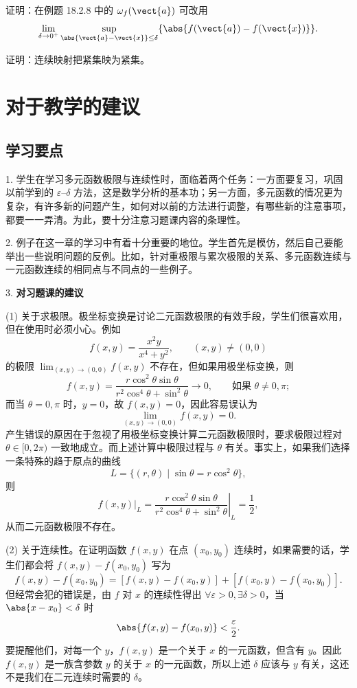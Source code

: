 \begin{xexercise}[9]
证明：在例题 18.2.8 中的 $\omega_f(\vect{a})$ 可改用
  \[
    \lim_{\delta\to0^+}\sup_{\abs{\vect{a}-\vect{x}}\le\delta}
    \{\abs{f(\vect{a})-f(\vect{x})}\}.
  \]
\end{xexercise}

\begin{xexercise}[10]
证明：连续映射把紧集映为紧集。
\end{xexercise}

\section{对于教学的建议}

\subsection{学习要点}

1. 学生在学习多元函数极限与连续性时，面临着两个任务：一方面要复习，巩固以前学到的 $\varepsilon$--$\delta$ 方法，这是数学分析的基本功；另一方面，多元函数的情况更为复杂，有许多新的问题产生，如何对以前的方法进行调整，有哪些新的注意事项，都要一一弄清。为此，要十分注意习题课内容的条理性。

2. 例子在这一章的学习中有着十分重要的地位。学生首先是模仿，然后自己要能举出一些说明问题的反例。比如，针对重极限与累次极限的关系、多元函数连续与一元函数连续的相同点与不同点的一些例子。

3. \textbf{对习题课的建议}

(1) 关于求极限。极坐标变换是讨论二元函数极限的有效手段，学生们很喜欢用，但在使用时必须小心。例如
\[
  f(x,y)=\frac{x^2y}{x^4+y^2},\qquad (x,y)\ne(0,0)
\]
的极限 $\displaystyle\lim_{(x,y)\to(0,0)}f(x,y)$ 不存在，但如果用极坐标变换，则
\[
  f(x,y)=\frac{r\cos^2\theta\sin\theta}{r^2\cos^4\theta+\sin^2\theta}\to0,
  \qquad \text{如果 }\theta\ne0,\pi;
\]
而当 $\theta=0,\pi$ 时，$y=0$，故 $f(x,y)=0$，因此容易误认为
\[
  \lim_{(x,y)\to(0,0)}f(x,y)=0.
\]
产生错误的原因在于忽视了用极坐标变换计算二元函数极限时，要求极限过程对 $\theta\in[0,2\pi)$ 一致地成立。而上述计算中极限过程与 $\theta$ 有关。事实上，如果我们选择一条特殊的趋于原点的曲线
\[
  L=\{(r,\theta)\mid\sin\theta=r\cos^2\theta\},
\]
则
\[
  f(x,y)\big|_L
  =\left.\frac{r\cos^2\theta\sin\theta}{r^2\cos^4\theta+\sin^2\theta}\right|_L
  =\frac12,
\]
从而二元函数极限不存在。

(2) 关于连续性。在证明函数 $f(x,y)$ 在点 $(x_0,y_0)$ 连续时，如果需要的话，学生们都会将 $f(x,y)-f(x_0,y_0)$ 写为
\[
  f(x,y)-f(x_0,y_0)
  =[f(x,y)-f(x_0,y)]+[f(x_0,y)-f(x_0,y_0)].
\]
但经常会犯的错误是，由 $f$ 对 $x$ 的连续性得出 $\forall\varepsilon>0,\exists\delta>0$，当 $\abs{x-x_0}<\delta$ 时
\[
  \abs{f(x,y)-f(x_0,y)}<\frac\varepsilon2.
\]
要提醒他们，对每一个 $y$，$f(x,y)$ 是一个关于 $x$ 的一元函数，但含有 $y$。因此 $f(x,y)$ 是一族含参数 $y$ 的关于 $x$ 的一元函数，所以上述 $\delta$ 应该与 $y$ 有关，这还不是我们在二元连续时需要的 $\delta$。

